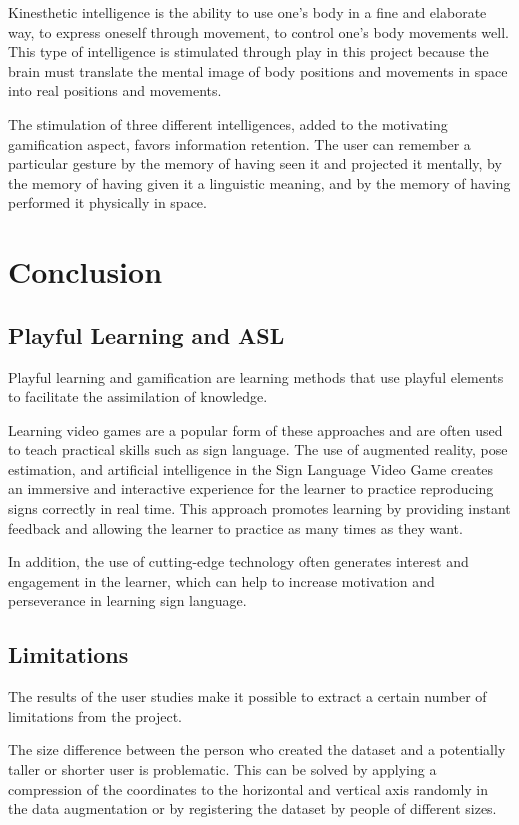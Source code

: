 Kinesthetic intelligence is the ability to use one's body in a fine and elaborate way, to express oneself through movement, to control one's body movements well. This type of intelligence is stimulated through play in this project because the brain must translate the mental image of body positions and movements in space into real positions and movements. 

The stimulation of three different intelligences, added to the motivating gamification aspect, favors information retention. The user can remember a particular gesture by the memory of having seen it and projected it mentally, by the memory of having given it a linguistic meaning, and by the memory of having performed it physically in space.

\section{Conclusion}

\subsection{Playful Learning and ASL}

Playful learning and gamification are learning methods that use playful elements to facilitate the assimilation of knowledge. 

Learning video games are a popular form of these approaches and are often used to teach practical skills such as sign language. The use of augmented reality, pose estimation, and artificial intelligence in the Sign Language Video Game creates an immersive and interactive experience for the learner to practice reproducing signs correctly in real time. This approach promotes learning by providing instant feedback and allowing the learner to practice as many times as they want. 

In addition, the use of cutting-edge technology often generates interest and engagement in the learner, which can help to increase motivation and perseverance in learning sign language.

\subsection{Limitations}

The results of the user studies make it possible to extract a certain number of limitations from the project.

The size difference between the person who created the dataset and a potentially taller or shorter user is problematic. This can be solved by applying a compression of the coordinates to the horizontal and vertical axis randomly in the data augmentation or by registering the dataset by people of different sizes.

